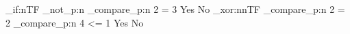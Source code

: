 \documentclass{article}
\begin{document}
\ExplSyntaxOn
\bool_if:nTF
  { 
    \bool_not_p:n 
      { \int_compare_p:n { 2 = 3 } }
  }
  { Yes }
  { No } 
\bool_xor:nnTF
  { \int_compare_p:n { 2 = 2 } }
  { \int_compare_p:n { 4 <= 1 } }
  { Yes }
  { No } 
\ExplSyntaxOff
\end{document}
